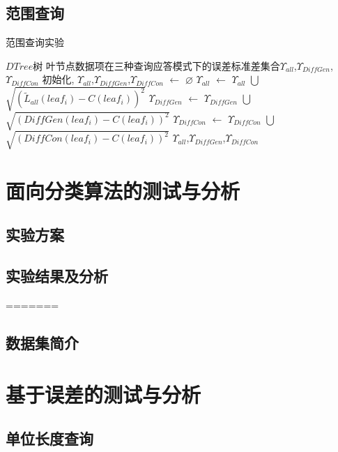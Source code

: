 \subsection{范围查询} 

\begin{algorithm}[H]
	\caption{范围查询实验}
	\begin{algorithmic}[1]
		\REQUIRE $DTree$树
		\ENSURE 叶节点数据项在三种查询应答模式下的误差标准差集合$\Upsilon_{all}$,$\Upsilon_{DiffGen}$,$\Upsilon_{DiffCon}$
		初始化, $\Upsilon_{all}$,$\Upsilon_{DiffGen}$,$\Upsilon_{DiffCon}$ $\leftarrow$ $\varnothing$
		\STATE $\Upsilon_{all}$ $\leftarrow$ $\Upsilon_{all}$ $\bigcup$ $\sqrt {(\tilde{L}_{all}(leaf_{i})-C(leaf_{i}))^2}$
		\STATE $\Upsilon_{DiffGen}$ $\leftarrow$ $\Upsilon_{DiffGen}$ $\bigcup$ $\sqrt {(DiffGen(leaf_{i})-C(leaf_{i}))^2}$
		\STATE $\Upsilon_{DiffCon}$ $\leftarrow$ $\Upsilon_{DiffCon}$ $\bigcup$ $\sqrt {(DiffCon(leaf_{i})-C(leaf_{i}))^2}$
		\ENDFOR
		\RETURN $\Upsilon_{all}$,$\Upsilon_{DiffGen}$,$\Upsilon_{DiffCon}$
	\end{algorithmic}
\end{algorithm}


\section{面向分类算法的测试与分析}

\subsection{实验方案}

\subsection{实验结果及分析}    

=======

\subsection{数据集简介}

\section{基于误差的测试与分析}

\subsection{单位长度查询} 

